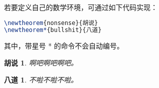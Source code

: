 若要定义自己的数学环境，可通过如下代码实现：
\begin{lstlisting}[language=tex]
\newtheorem{nonsense}{胡说}
\newtheorem*{bullshit}{八道}
\end{lstlisting}
其中，带星号 * 的命令不会自动编号。

\newtheorem{nonsense}{胡说}
\newtheorem*{bullshit}{八道}

\begin{nonsense}
  啊吧啊吧啊吧。
\end{nonsense}

\begin{bullshit}
  不啦不啦不啦。
\end{bullshit}